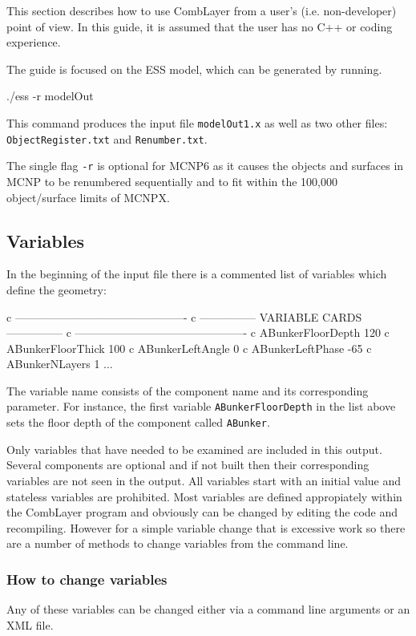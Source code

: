 This section describes how to use CombLayer from a user's (i.e. non-developer) point of view.
In this guide, it is assumed that the user has no C++ or coding experience.

The guide is focused on the ESS model, which can be generated by running. 
\begin{bash}
  ./ess -r modelOut
\end{bash}
This command produces the \mcnp input file {\tt modelOut1.x} as well as two other files: {\tt ObjectRegister.txt} and {\tt Renumber.txt}.

The single flag {\tt -r} is optional for MCNP6 as it causes the objects and surfaces in MCNP to be renumbered sequentially and
to fit within the 100,000 object/surface limits of MCNPX.

\subsection{Variables}
In the beginning of the input file there is a commented list of variables which define the geometry:

\begin{deck}
 c ----------------------------------------------
 c --------------- VARIABLE CARDS ---------------
 c ----------------------------------------------
 c ABunkerFloorDepth 120
 c ABunkerFloorThick 100
 c ABunkerLeftAngle 0
 c ABunkerLeftPhase -65
 c ABunkerNLayers 1
 ...
\end{deck}

The variable name consists of the component name and its corresponding parameter. For instance,
the first variable {\tt ABunkerFloorDepth} in the list above sets the floor depth of the component called {\tt ABunker}.

Only variables that have needed to be examined are included in this output. Several components are optional and if not built then
their corresponding variables are not seen in the output. All variables start with an initial value and stateless variables are prohibited.
Most variables are defined appropiately within the CombLayer program and obviously can be changed by editing the code and recompiling.
However for a simple variable change that is excessive work so there are a number of methods to change variables from the command line.

\subsubsection{How to change variables}
Any of these variables can be changed either via a command line arguments or an XML file.

